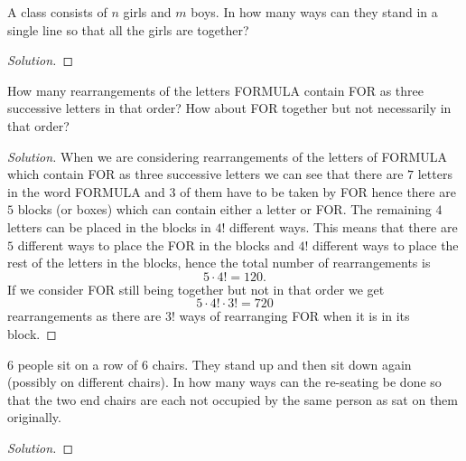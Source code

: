 \documentclass[10pt, a4paper]{article}
\begin{document}
\newpage

\begin{problem}[Q14]
    A class consists of $n$ girls and $m$ boys. In how many ways can they stand in a single line so that all the girls are together?

    \begin{proof}[Solution]\renewcommand{\qedsymbol}{}
        
    \end{proof}
\end{problem}

\newpage

\begin{problem}[Q15]
    How many rearrangements of the letters FORMULA contain FOR as three successive letters in that order? How about FOR together but not necessarily in that order?
    \begin{proof}[Solution]\renewcommand{\qedsymbol}{}
        When we are considering rearrangements of the letters of FORMULA which contain FOR as three successive letters we can see that there are $7$ letters in the word FORMULA and $3$ of them have to be taken by FOR hence there are $5$ blocks (or boxes) which can contain either a letter or FOR. The remaining $4$ letters can be placed in the blocks in $4!$ different ways. This means that there are $5$ different ways to place the FOR in the blocks and $4!$ different ways to place the rest of the letters in the blocks, hence the total number of rearrangements is
        \[
        5 \cdot 4! = 120.
        \]
        If we consider FOR still being together but not in that order we get
        \[
        5 \cdot 4! \cdot 3! = 720
        \]
        rearrangements as there are $3!$ ways of rearranging FOR when it is in its block.
    \end{proof}
\end{problem}

\newpage

\begin{problem}[Q16]
    $6$ people sit on a row of $6$ chairs. They stand up and then sit down again (possibly on different chairs). In how many ways can the re-seating be done so that the two end chairs are each not occupied by the same person as sat on them originally.
    \begin{proof}[Solution]\renewcommand{\qedsymbol}{}
        
    \end{proof}
\end{problem}
\end{document}
